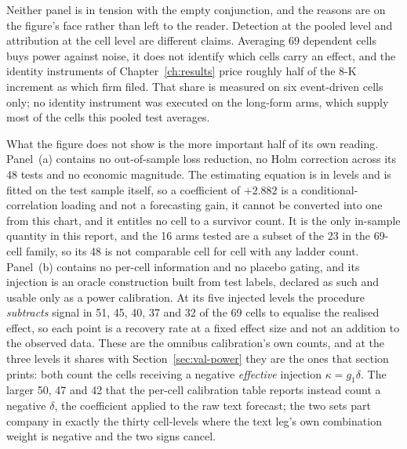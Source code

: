 Neither panel is in tension with the empty conjunction, and the reasons are on
the figure's face rather than left to the reader. Detection at the pooled
level and attribution at the cell level are different claims. Averaging 69
dependent cells buys power against noise, it does not identify which cells
carry an effect, and the identity instruments of Chapter~\ref{ch:results} price
roughly half of the 8-K increment as which firm filed. That share is measured
on six event-driven cells only; no identity instrument was executed on the
long-form arms, which supply most of the cells this pooled test averages. %

What the figure does not show is the more important half of its own reading.
Panel~(a) contains no out-of-sample loss reduction, no Holm correction across
its 48 tests and no economic magnitude. The estimating equation is in levels
and is fitted on the test sample itself, so a coefficient of $+2.882$ is a
conditional-correlation loading and not a forecasting gain, it cannot be
converted into one from this chart, and it entitles no cell to a survivor
count. It is the only in-sample quantity in this report, and the 16 arms
tested are a subset of the 23 in the 69-cell family, so its 48 is not
comparable cell for cell with any ladder count. Panel~(b) contains no per-cell
information and no placebo gating, and its injection is an oracle construction
built from test labels, declared as such and usable only as a power
calibration. At its five injected levels the procedure \emph{subtracts} signal
in 51, 45, 40, 37 and 32 of the 69 cells to equalise the realised effect, so
each point is a recovery rate at a fixed effect size and not an addition to
the observed data. These are the omnibus calibration's own counts, and at
the three levels it shares with Section~\ref{sec:val-power} they are the ones
that section prints: both count the cells receiving a negative \emph{effective}
injection $\kappa = g_{1}\delta$. The larger 50, 47 and 42 that the per-cell
calibration table reports instead count a negative $\delta$, the coefficient
applied to the raw text forecast; the two sets part company in exactly the
thirty cell-levels where the text leg's own combination weight is negative and
the two signs cancel. %

